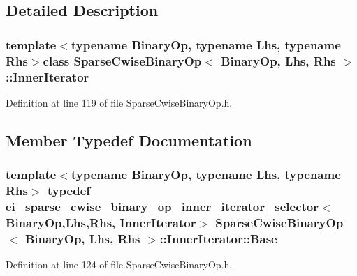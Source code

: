 \subsection{Detailed Description}
\subsubsection*{template$<$typename Binary\-Op, typename Lhs, typename Rhs$>$class Sparse\-Cwise\-Binary\-Op$<$ Binary\-Op, Lhs, Rhs $>$\-::\-Inner\-Iterator}



Definition at line 119 of file Sparse\-Cwise\-Binary\-Op.\-h.



\subsection{Member Typedef Documentation}
\hypertarget{class_sparse_cwise_binary_op_1_1_inner_iterator_a05056b207f79207adf21c4ec5bce8302}{
\subsubsection[{Base}]{\setlength{\rightskip}{0pt plus 5cm}template$<$typename Binary\-Op, typename Lhs, typename Rhs$>$ typedef {\bf ei\-\_\-sparse\-\_\-cwise\-\_\-binary\-\_\-op\-\_\-inner\-\_\-iterator\-\_\-selector}$<$ Binary\-Op,Lhs,Rhs, {\bf Inner\-Iterator}$>$ {\bf Sparse\-Cwise\-Binary\-Op}$<$ Binary\-Op, Lhs, Rhs $>$\-::{\bf Inner\-Iterator\-::\-Base}}}\label{class_sparse_cwise_binary_op_1_1_inner_iterator_a05056b207f79207adf21c4ec5bce8302}


Definition at line 124 of file Sparse\-Cwise\-Binary\-Op.\-h.



